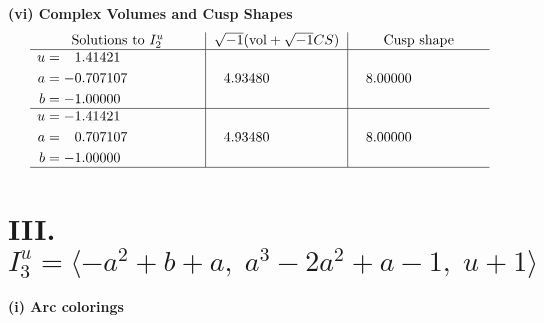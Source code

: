 \documentclass[1p]{elsarticle_modified}
\theoremstyle{definition}
\newcommand{\I}{\sqrt{-1}}
\begin{document}
\newpage\flushleft \textbf{(vi) Complex Volumes and Cusp Shapes}
$$\begin{array}{c|c|c}  
\text{Solutions to }I^u_{2}& \I (\text{vol} + \sqrt{-1}CS) & \text{Cusp shape}\\
 \hline 
\begin{aligned}
u &= \phantom{-}1.41421\phantom{ +0.000000I} \\
a &= -0.707107\phantom{ +0.000000I} \\
b &= -1.00000\phantom{ +0.000000I}\end{aligned}
 & \phantom{-}4.93480\phantom{ +0.000000I} & \phantom{-}8.00000\phantom{ +0.000000I} \\ \hline\begin{aligned}
u &= -1.41421\phantom{ +0.000000I} \\
a &= \phantom{-}0.707107\phantom{ +0.000000I} \\
b &= -1.00000\phantom{ +0.000000I}\end{aligned}
 & \phantom{-}4.93480\phantom{ +0.000000I} & \phantom{-}8.00000\phantom{ +0.000000I}\\
 \hline 
 \end{array}$$\newpage\newpage\renewcommand{\arraystretch}{1}
\centering \section*{III. $I^u_{3}= \langle - a^2+b+a,\;a^3-2 a^2+a-1,\;u+1 \rangle$}
\flushleft \textbf{(i) Arc colorings}\\
\end{document}

